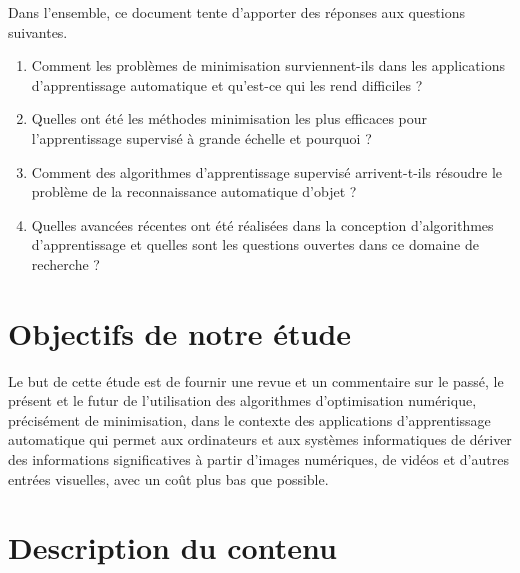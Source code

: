 		Dans l'ensemble, ce document tente d'apporter des réponses aux questions suivantes.
		\begin{enumerate}
			\item Comment les problèmes de minimisation surviennent-ils dans les applications d'apprentissage automatique et qu'est-ce qui les rend difficiles ?
			\item Quelles ont été les méthodes minimisation les plus efficaces pour l'apprentissage supervisé à grande échelle et pourquoi ?
			\item Comment des algorithmes d'apprentissage supervisé arrivent-t-ils résoudre le problème de la reconnaissance automatique d'objet ?
			\item Quelles avancées récentes ont été réalisées dans la conception d'algorithmes d'apprentissage et quelles sont les questions ouvertes dans ce domaine de recherche ?
		\end{enumerate}
		
		
	
	\section{Objectifs de notre étude}
		Le but de cette étude est de fournir une revue et un commentaire sur le passé, le présent et le futur de l'utilisation des algorithmes d'optimisation numérique, précisément de minimisation, dans le contexte des applications d'apprentissage automatique qui permet aux ordinateurs et aux systèmes informatiques de dériver des informations significatives à partir d'images numériques, de vidéos et d'autres entrées visuelles, avec un coût plus bas que possible. 
		
	\section{Description du contenu}
		
		
		
		